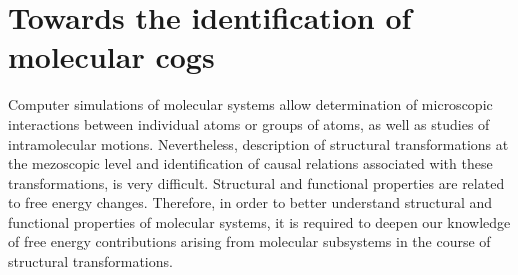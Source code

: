 



\newenvironment{packeditemize}
{ \begin{itemize}
    \setlength{\itemsep}{1.5pt}
    \setlength{\parskip}{1.5pt}
    \setlength{\parsep}{1.5pt}     }
{ \end{itemize}                  } 

\newenvironment{packedenum}
{ \begin{enumerate}
    \setlength{\itemsep}{1.5pt}
    \setlength{\parskip}{1.5pt}
    \setlength{\parsep}{1.5pt}     }
{ \end{enumerate}                  } 


\newcommand{\specialcell}[2][c]{%
  \begin{tabular}[#1]{@{}c@{}}#2\end{tabular}}





\chapter[Towards molecular cogs]{Towards the identification of molecular cogs}


Computer simulations of molecular systems allow determination of microscopic interactions between individual atoms or groups of atoms, as well as studies of intramolecular motions. 
Nevertheless, description of structural transformations at the mezoscopic level and identification of causal relations associated with these transformations, is very difficult.
Structural and functional properties are related to free energy changes.
Therefore, in order to better understand structural and functional properties of molecular systems, it is required to deepen our knowledge of free energy contributions arising from molecular subsystems in the course of structural transformations.

